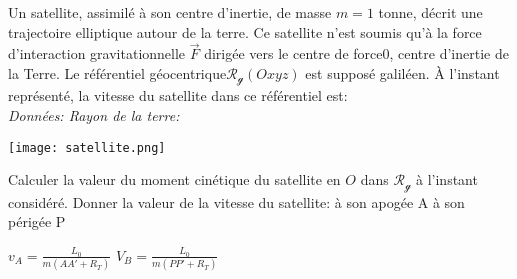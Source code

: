 \begin{Exercise}[title=Moment cinétique d'un satellite]
  Un satellite, assimilé à son centre d’inertie, de masse $m = 1$ tonne, décrit
  une trajectoire elliptique autour de la terre. Ce satellite n’est soumis qu’à
  la force d’interaction gravitationnelle $\vec{F}$ dirigée vers le centre de
  force$0$, centre d’inertie de la Terre. Le référentiel
  géocentrique$\mathcal{R_g}(Oxyz)$ est supposé galiléen.
  À l’instant représenté, la vitesse du satellite dans ce
  référentiel est: \\
  \emph{Données: Rayon de la terre: }
  \begin{center}
    \texttt{[image: satellite.png]}
  \end{center}
  \Question Calculer la valeur du moment cinétique du satellite en $O$ dans
  $\mathcal{R_g}$ à l'instant considéré.
  \Question Donner la valeur de la vitesse du satellite:
  \subQuestion à son apogée A
  \subQuestion à son périgée P

\end{Exercise}
\begin{Answer}
  \Question {}
  \Question
  \subQuestion $v_A=\frac{L_0}{m(AA'+R_T)}$
  \subQuestion $V_B=\frac{L_0}{m(PP'+R_T)}$
\end{Answer}
